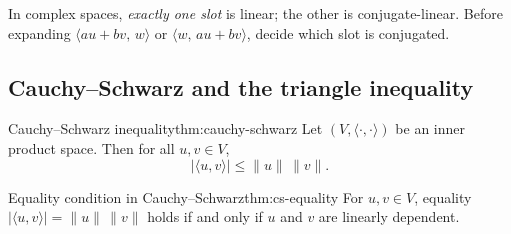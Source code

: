 \begin{commonmistake}[title={Common Mistake: complex linearity in the wrong slot}]
In complex spaces, \emph{exactly one slot} is linear; the other is conjugate-linear.
Before expanding $\langle au+bv,\,w\rangle$ or $\langle w,\,au+bv\rangle$, decide which slot is conjugated.
\end{commonmistake}

\subsection{Cauchy--Schwarz and the triangle inequality}

\begin{theorem}{Cauchy--Schwarz inequality}{thm:cauchy-schwarz}
Let $(V,\langle\cdot,\cdot\rangle)$ be an inner product space. Then for all $u,v\in V$,
\[
|\langle u,v\rangle|\le \|u\|\,\|v\|.
\]
\end{theorem}

\begin{theorem}{Equality condition in Cauchy--Schwarz}{thm:cs-equality}
For $u,v\in V$, equality $|\langle u,v\rangle|=\|u\|\,\|v\|$ holds if and only if $u$ and $v$ are linearly dependent.
\end{theorem}

